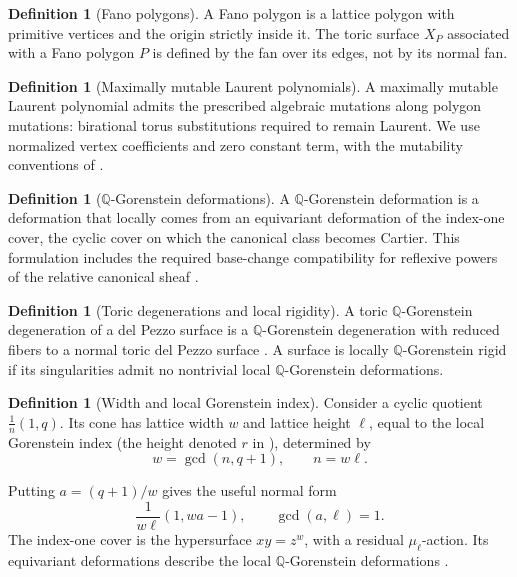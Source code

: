 \documentclass[11pt]{article}
\theoremstyle{plain}
\theoremstyle{definition}
\newtheorem{definition}[theorem]{Definition}
\theoremstyle{remark}
\newcommand{\Q}{\mathbb Q}
\newcommand{\1}{\mathbf 1}
\begin{document}
\begin{definition}[Fano polygons]
A Fano polygon is a lattice polygon with primitive vertices and the origin strictly inside it.  The toric surface $X_P$ associated with a Fano polygon $P$ is defined by the fan over its edges, not by its normal fan.
\end{definition}

\begin{definition}[Maximally mutable Laurent polynomials]
A maximally mutable Laurent polynomial admits the prescribed algebraic mutations along polygon mutations: birational torus substitutions required to remain Laurent.  We use normalized vertex coefficients and zero constant term, with the mutability conventions of \cite[Section 3]{CKPT}.
\end{definition}

\begin{definition}[$\Q$-Gorenstein deformations]
A $\Q$-Gorenstein deformation is a deformation that locally comes from an equivariant deformation of the index-one cover, the cyclic cover on which the canonical class becomes Cartier.  This formulation includes the required base-change compatibility for reflexive powers of the relative canonical sheaf \cite[Basic Concepts]{ACC+}.
\end{definition}

\begin{definition}[Toric degenerations and local rigidity]
A toric $\Q$-Gorenstein degeneration of a del Pezzo surface is a $\Q$-Gorenstein degeneration with reduced fibers to a normal toric del Pezzo surface \cite[Definition 1]{ACC+}.  A surface is locally $\Q$-Gorenstein rigid if its singularities admit no nontrivial local $\Q$-Gorenstein deformations.
\end{definition}

\begin{definition}[Width and local Gorenstein index]
Consider a cyclic quotient $\frac1n(1,q)$.  Its cone has lattice width $w$ and lattice height $\ell$, equal to the local Gorenstein index (the height denoted $r$ in \cite[Basic Concepts]{ACC+}), determined by
\[
w=\gcd(n,q+1),\qquad n=w\ell.
\]
\end{definition}
Putting $a=(q+1)/w$ gives the useful normal form
\begin{equation}\label{eq:cyclic-normal-form}
\frac1{w\ell}(1,wa-1),\qquad \gcd(a,\ell)=1.
\end{equation}
The index-one cover is the hypersurface $xy=z^w$, with a residual $\mu_\ell$-action.  Its equivariant deformations describe the local $\Q$-Gorenstein deformations \cite[Basic Concepts]{ACC+}.
\end{document}
